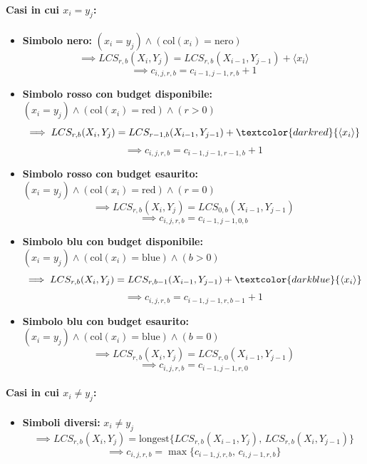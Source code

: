 \paragraph{Casi in cui $x_i = y_j$:}
\begin{itemize}
    \item \textbf{Simbolo nero:} $(x_i = y_j) \land (\text{col}(x_i) = \text{nero})$
    \[
        \implies LCS_{r,b}(X_i, Y_j) = LCS_{r,b}(X_{i-1}, Y_{j-1}) + \langle x_i \rangle
    \]
    \[
        \implies c_{i,j,r,b} = c_{i-1,j-1,r,b} + 1
    \]

    \item \textbf{Simbolo rosso con budget disponibile:} $(x_i = y_j) \land (\text{col}(x_i) = \text{red}) \land (r > 0)$
    \[
        \implies LCS_{r,b}(X_i, Y_j) = LCS_{r-1,b}(X_{i-1}, Y_{j-1}) + \textcolor{darkred}{\langle x_i \rangle}
    \]
    \[
        \implies c_{i,j,r,b} = c_{i-1,j-1,r-1,b} + 1
    \]

    \item \textbf{Simbolo rosso con budget esaurito:} $(x_i = y_j) \land (\text{col}(x_i) = \text{red}) \land (r = 0)$
    \[
        \implies LCS_{r,b}(X_i, Y_j) = LCS_{0,b}(X_{i-1}, Y_{j-1})
    \]
    \[
        \implies c_{i,j,r,b} = c_{i-1,j-1,0,b}
    \]

    \item \textbf{Simbolo blu con budget disponibile:} $(x_i = y_j) \land (\text{col}(x_i) = \text{blue}) \land (b > 0)$
    \[
        \implies LCS_{r,b}(X_i, Y_j) = LCS_{r,b-1}(X_{i-1}, Y_{j-1}) + \textcolor{darkblue}{\langle x_i \rangle}
    \]
    \[
        \implies c_{i,j,r,b} = c_{i-1,j-1,r,b-1} + 1
    \]

    \item \textbf{Simbolo blu con budget esaurito:} $(x_i = y_j) \land (\text{col}(x_i) = \text{blue}) \land (b = 0)$
    \[
        \implies LCS_{r,b}(X_i, Y_j) = LCS_{r,0}(X_{i-1}, Y_{j-1})
    \]
    \[
        \implies c_{i,j,r,b} = c_{i-1,j-1,r,0}
    \]
\end{itemize}

\paragraph{Casi in cui $x_i \neq y_j$:}
\begin{itemize}
    \item \textbf{Simboli diversi:} $x_i \neq y_j$
    \[
        \implies LCS_{r,b}(X_i, Y_j) = \text{longest}\big\{LCS_{r,b}(X_{i-1}, Y_j),\, LCS_{r,b}(X_i, Y_{j-1})\big\}
    \]
    \[
        \implies c_{i,j,r,b} = \max\big\{c_{i-1,j,r,b},\, c_{i,j-1,r,b}\big\}
    \]
\end{itemize}

